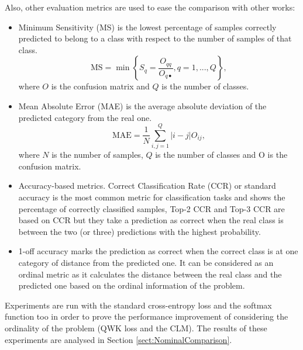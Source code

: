 \documentclass[journal]{IEEEtran}
\begin{document}
	Also, other evaluation metrics are used to ease the comparison with other works:
	\begin{itemize}
		\item Minimum Sensitivity (MS) \cite{cruz2014metrics} is the lowest percentage of samples correctly predicted to belong to a class with respect to the number of samples of that class.
		\begin{equation}
			\nonumber
			\text{MS} = \min\left\lbrace S_q = \frac{O_{qq}}{O_{q\bullet}}, q = 1, ..., Q \right\rbrace,
		\end{equation}
		where $O$ is the confusion matrix and $Q$ is the number of classes.
		
		\item Mean Absolute Error (MAE) \cite{cruz2014metrics} is the average absolute deviation of the predicted category from the real one.
		\begin{equation}
			\nonumber
			\text{MAE} = \frac{1}{N} \sum^Q_{i,j = 1} |i-j|O_{ij},
		\end{equation}
		where $N$ is the number of samples, $Q$ is the number of classes and O is the confusion matrix.
		
		\item Accuracy-based metrics. Correct Classification Rate (CCR) or standard accuracy is the most common metric for classification tasks and shows the percentage of correctly classified samples, Top-2 CCR \cite{beckham2017unimodal} and Top-3 CCR \cite{beckham2017unimodal} are based on CCR but they take a prediction as correct when the real class is between the two (or three) predictions with the highest probability.
		
		\item 1-off accuracy \cite{eidinger2014age,chen2016cascaded,levi2015age} marks the prediction as correct when the correct class is at one category of distance from the predicted one. It can be considered as an ordinal metric as it calculates the distance between the real class and the predicted one based on the ordinal information of the problem.
	\end{itemize}
	
	Experiments are run with the standard cross-entropy loss and the softmax function too in order to prove the performance improvement of considering the ordinality of the problem (QWK loss and the CLM). The results of these experiments are analysed in Section \ref{sect:NominalComparison}.
	
\end{document}
